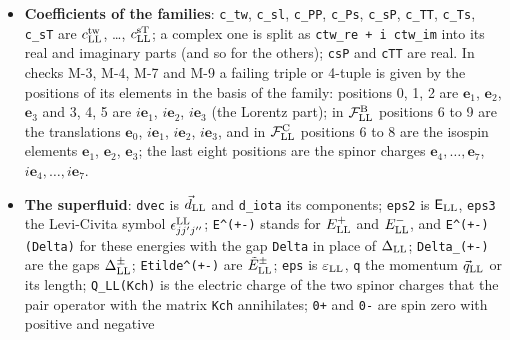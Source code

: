 \documentclass[
  10pt,
]{article}
\begin{document}
\begin{itemize}
  associator; \texttt{Jac} the Jacobiator; \texttt{L\_x}, \texttt{R\_x}
  the left and right multiplications \(L^{\rm LL}_{\mathbf x}\),
  \(R^{\rm LL}_{\mathbf x}\), and \texttt{L\_{[}e1,e4{]}} the left
  multiplication by the commutator \([\mathbf e_1,\mathbf e_4]\);
  \texttt{cross(a,\ b)} is the cross product of two complex
  three-component vectors; \texttt{\textbar{}...\textbar{}} an absolute
  value or the length of a vector; the dot in \texttt{kE.(kE+pE)} the
  Euclidean scalar product; \texttt{x\ -\textgreater{}\ y} a map;
  \texttt{x(y)} a product or a function value, as the context of the
  formula shows.
\item
  \textbf{Coefficients of the families}: \texttt{c\_tw}, \texttt{c\_sl},
  \texttt{c\_PP}, \texttt{c\_Ps}, \texttt{c\_sP}, \texttt{c\_TT},
  \texttt{c\_Ts}, \texttt{c\_sT} are \(c^{\rm tw}_{\rm LL}\), \ldots,
  \(c^{\rm sT}_{\rm LL}\); a complex one is split as
  \texttt{ctw\_re\ +\ i\ ctw\_im} into its real and imaginary parts (and
  so for the others); \texttt{csP} and \texttt{cTT} are real. In checks
  M-3, M-4, M-7 and M-9 a failing triple or 4-tuple is given by the
  positions of its elements in the basis of the family: positions 0, 1,
  2 are \(\mathbf e_1\), \(\mathbf e_2\), \(\mathbf e_3\) and 3, 4, 5
  are \(i\mathbf e_1\), \(i\mathbf e_2\), \(i\mathbf e_3\) (the Lorentz
  part); in \(\mathcal F^{\rm B}_{\rm LL}\) positions 6 to 9 are the
  translations \(\mathbf e_0\), \(i\mathbf e_1\), \(i\mathbf e_2\),
  \(i\mathbf e_3\), and in \(\mathcal F^{\rm C}_{\rm LL}\) positions 6
  to 8 are the isospin elements \(\mathbf e_1\), \(\mathbf e_2\),
  \(\mathbf e_3\); the last eight positions are the spinor charges
  \(\mathbf e_4,\dots,\mathbf e_7\),
  \(i\mathbf e_4,\dots,i\mathbf e_7\).
\item
  \textbf{The superfluid}: \texttt{dvec} is \(\vec d_{\rm LL}\) and
  \texttt{d\_iota} its components; \texttt{eps2} is
  \(\mathsf E_{\rm LL}\), \texttt{eps3} the Levi-Civita symbol
  \(\epsilon^{\rm LL}_{jj'j''}\); \texttt{E\^{}(+-)} stands for
  \(E^+_{\rm LL}\) and \(E^-_{\rm LL}\), and \texttt{E\^{}(+-)(Delta)}
  for these energies with the gap \texttt{Delta} in place of
  \(\Delta_{\rm LL}\); \texttt{Delta\_(+-)} are the gaps
  \(\Delta^\pm_{\rm LL}\); \texttt{Etilde\^{}(+-)} are
  \(\tilde E^\pm_{\rm LL}\); \texttt{eps} is \(\varepsilon_{\rm LL}\),
  \texttt{q} the momentum \(\vec q_{\rm LL}\) or its length;
  \texttt{Q\_LL(Kch)} is the electric charge of the two spinor charges
  that the pair operator with the matrix \texttt{Kch} annihilates;
  \texttt{0+} and \texttt{0-} are spin zero with positive and negative

\end{itemize}
\end{document}
